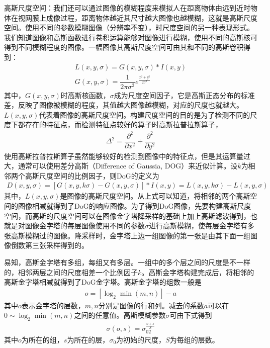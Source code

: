 \documentclass[supercite]{HustGraduPaper}
\begin{document}
\begin{sloppypar}
\begin{appendices}
    {\heiti  高斯尺度空间：}我们还可以通过图像的模糊程度来模拟人在距离物体由远到近时物体在视网膜上成像过程，距离物体越近其尺寸越大图像也越模糊，这就是高斯尺度空间。使用不同的参数模糊图像（分辨率不变），时尺度空间的另一种表现形式。我们知道图像和高斯函数进行卷积运算能够对图像进行模糊，使用不同的高斯核可得到不同模糊程度的图像。一幅图像其高斯尺度空间可由其和不同的高斯卷积得到：\begin{gather}
      L(x,y,\sigma)=G(x,y,\sigma)*I(x,y)\\
      G(x,y,\sigma)=\dfrac{1}{2\pi\sigma^2}e^{\frac{x^2+y^2}{2\sigma^2}}
    \end{gather}
    其中，$G(x,y,\sigma)$时高斯核函数，$\sigma$成为尺度空间因子，它是高斯正态分布的标准差，反映了图像被模糊的程度，其值越大图像越模糊，对应的尺度也就越大。$L(x,y,\sigma)$代表着图像的高斯尺度空间。构建尺度空间的目的是为了检测不同的尺度下都存在的特征点，而检测特征点较好的算子时高斯拉普拉斯算子，\begin{gather}
      \Delta^2=\dfrac{\partial^2}{\partial x^2}+\dfrac{\partial^2}{\partial y^2}
    \end{gather}
    使用高斯拉普拉斯算子虽然能够较好的检测到图像中的特征点，但是其运算量过大，通常可以使用差分高斯（Difference of Gaussia, DOG）来近似计算。设$k$为相邻两个高斯尺度空间的比例因子，则DoG的定义为\begin{gather}
     D(x,y,\sigma)=[G(x,y,k\sigma)-G(x,y,\sigma)]*I(x,y)=L(x,y,k\sigma)-L(x,y,\sigma)
    \end{gather}
    其中，$L(x,y,\sigma)$是图像的高斯尺度空间。从上式可以知道，将相邻的两个高斯空间的图像相减就得到了DoG的响应图像。为了得到DoG图像，先要构建高斯尺度空间，而高斯的尺度空间可以在图像金字塔降采样的基础上加上高斯滤波得到，也就是对图像金字塔的每层图像使用不同的参数$\sigma$进行高斯模糊，使每层金字塔有多张高斯模糊过的图像。降采样时，金字塔上边一组图像的第一张是由其下面一组图像倒数第三张采样得到的。

    易知，高斯金字塔有多组，每组又有多层。一组中的多个层之间的尺度是不一样的，相邻两层之间的尺度相差一个比例因子$k$。高斯金字塔构建完成后，将相邻的高斯金字塔相减就得到了DoG金字塔。高斯金字塔的组数一般是\begin{gather}
      o=[\log_2\min(m,n)]-a
    \end{gather}
    其中$o$表示金字塔的层数，$m,n$分别是图像的行和列。减去的系数$a$可以在$0\sim\log_2\min(m,n)$之间的任意值。高斯模糊参数$\sigma$可由下式得到\begin{gather}
      \sigma(o,s)=\sigma_02^{\frac{o+s}{S}}
    \end{gather}
    其中$o$为所在的组，$s$为所在的层，$\sigma_0$为初始的尺度，$S$为每组的层数。


\end{appendices}
\end{sloppypar}
\end{document}
